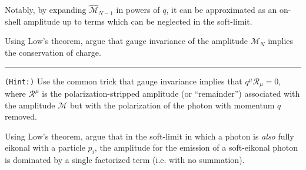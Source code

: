 Notably, by expanding \(\widehat{\mathcal{M}}_{N-1}\) in powers of \(q\), it can be approximated as an on-shell amplitude up to terms which can be neglected in the \gls{soft-limit}.


\begin{exercise}
    Using Low's  theorem, argue that gauge invariance of the amplitude \(\mathcal{M}_N\) implies the conservation of charge.

    \vspace{7pt}
    \hrule
    \vspace{7pt}

    \texttt{(Hint:)}
    Use the common trick that gauge invariance implies that \(q^\mu \mathcal{R}_\mu = 0\), where \(\mathcal{R}^\mu\) is the polarization-stripped amplitude (or ``remainder'') associated with the amplitude \(\mathcal{M}\) but with the polarization of the photon with momentum \(q\) removed.
\end{exercise}

\begin{exercise}
    \label{ex:soft-eikonal-photon}
    Using Low's theorem, argue that in the \gls{soft-limit} in which a photon is \textit{also} fully eikonal with a particle \(p_i\), the amplitude for the emission of a soft-eikonal photon is dominated by a single factorized term (i.e. with no summation).
\end{exercise}




